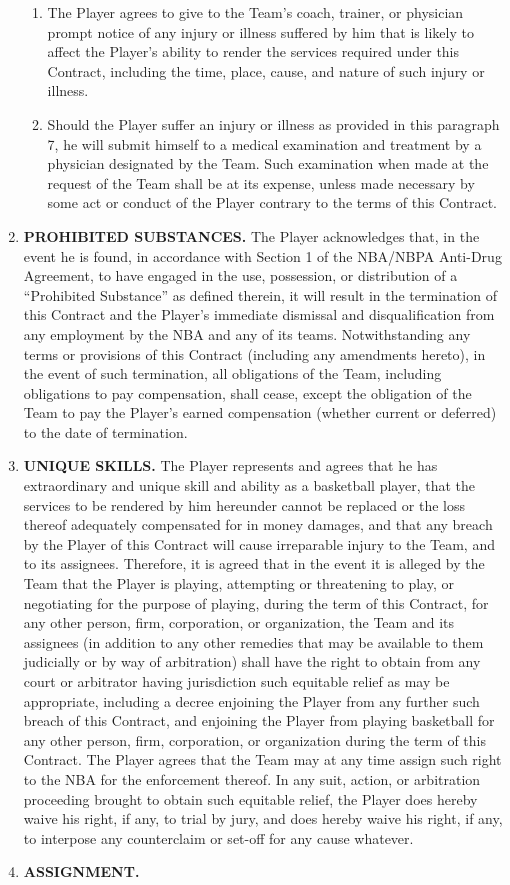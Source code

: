 \documentclass[
]{book}
\begin{document}
\begin{enumerate}
\begin{enumerate}
  \item
    The Player agrees to give to the Team's coach, trainer, or physician prompt notice of any injury or illness suffered by him that is likely to affect the Player's ability to render the services required under this Contract, including the time, place, cause, and nature of such injury or illness.
  \item
    Should the Player suffer an injury or illness as provided in this paragraph 7, he will submit himself to a medical examination and treatment by a physician designated by the Team. Such examination when made at the request of the Team shall be at its expense, unless made necessary by some act or conduct of the Player contrary to the terms of this Contract.
  \end{enumerate}
\item
  \textbf{PROHIBITED SUBSTANCES.} The Player acknowledges that, in the event he is found, in accordance with Section 1 of the NBA/NBPA Anti-Drug Agreement, to have engaged in the use, possession, or distribution of a ``Prohibited Substance'' as defined therein, it will result in the termination of this Contract and the Player's immediate dismissal and disqualification from any employment by the NBA and any of its teams. Notwithstanding any terms or provisions of this Contract (including any amendments hereto), in the event of such termination, all obligations of the Team, including obligations to pay compensation, shall cease, except the obligation of the Team to pay the Player's earned compensation (whether current or deferred) to the date of termination.
\item
  \textbf{UNIQUE SKILLS.} The Player represents and agrees that he has extraordinary and unique skill and ability as a basketball player, that the services to be rendered by him hereunder cannot be replaced or the loss thereof adequately compensated for in money damages, and that any breach by the Player of this Contract will cause irreparable injury to the Team, and to its assignees. Therefore, it is agreed that in the event it is alleged by the Team that the Player is playing, attempting or threatening to play, or negotiating for the purpose of playing, during the term of this Contract, for any other person, firm, corporation, or organization, the Team and its assignees (in addition to any other remedies that may be available to them judicially or by way of arbitration) shall have the right to obtain from any court or arbitrator having jurisdiction such equitable relief as may be appropriate, including a decree enjoining the Player from any further such breach of this Contract, and enjoining the Player from playing basketball for any other person, firm, corporation, or organization during the term of this Contract. The Player agrees that the Team may at any time assign such right to the NBA for the enforcement thereof. In any suit, action, or arbitration proceeding brought to obtain such equitable relief, the Player does hereby waive his right, if any, to trial by jury, and does hereby waive his right, if any, to interpose any counterclaim or set-off for any cause whatever.
\item
  \textbf{ASSIGNMENT.}


\end{enumerate}
\end{document}

